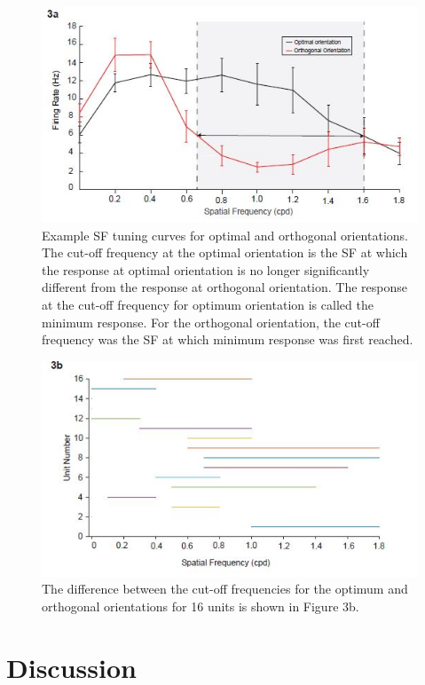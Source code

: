 			\begin{figure}
				\includegraphics[width=\linewidth]{SCOptOrth.jpg}
				\caption{Example SF tuning curves for optimal and orthogonal orientations. The cut-off frequency at the
					optimal orientation is the SF at which the response at optimal orientation is no longer significantly different from the response at orthogonal
					orientation. The response at the cut-off frequency for optimum orientation is called the minimum response. For the orthogonal orientation, the
					cut-off frequency was the SF at which minimum response was first reached.}
				\label{fig:fig5}			
			\end{figure}

			\begin{figure}
				\includegraphics[width=\linewidth]{SCSFTuning.jpg}
				\caption{ The difference between the cut-off frequencies for the optimum
					and orthogonal orientations for 16 units is shown in Figure 3b.}
				\label{fig:fig6}			
			\end{figure}
\section{Discussion}

